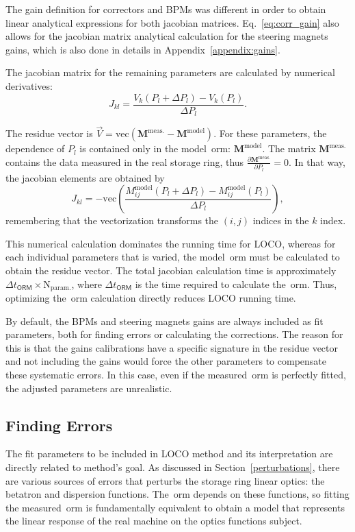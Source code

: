 The gain definition for correctors and BPMs was different in order to obtain linear analytical expressions for both jacobian matrices. Eq.~\eqref{eq:corr_gain} also allows for the jacobian matrix analytical calculation for the steering magnets gains, which is also done in details in Appendix~\ref{appendix:gains}. 

The jacobian matrix for the remaining parameters are calculated by numerical derivatives:
\begin{equation}
    J_{kl} = \dfrac{V_{k}\left(P_{l} + \Delta P_{l}\right) - V_{k}\left(P_{l}\right)}{\Delta P_{l}}.
\end{equation}

The residue vector is $\vec{V} = \mathrm{vec}\left(\mathbf{M}^{\mathrm{meas.}} - \mathbf{M}^{\mathrm{model}}\right)$. For these parameters, the dependence of $P_l$ is contained only in the model~\gls{orm}: $\mathbf{M}^{\mathrm{model}}$. The matrix $\mathbf{M}^{\mathrm{meas.}}$ contains the data measured in the real storage ring, thus $\frac{\partial\mathbf{M}^{\mathrm{meas.}}}{\partial P_l} = 0$. In that way, the jacobian elements are obtained by
\begin{equation}
    J_{kl} = -\mathrm{vec}\left(\dfrac{M_{ij}^{\mathrm{model}}\left(P_{l} + \Delta P_{l}\right) - M_{ij}^{\mathrm{model}}\left(P_{l}\right)}{\Delta P_{l}}\right),
\end{equation}
remembering that the vectorization transforms the $(i, j)$ indices in the $k$ index.

This numerical calculation dominates the running time for LOCO, whereas for each individual parameters that is varied, the model~\gls{orm} must be calculated to obtain the residue vector. The total jacobian calculation time is approximately $\Delta t_{\mathsf{ORM}} \times \mathrm{N}_{\mathrm{param.}}$, where $\Delta t_{\mathsf{ORM}}$ is the time required to calculate the~\gls{orm}. Thus, optimizing the~\gls{orm} calculation directly reduces LOCO running time. 

By default, the BPMs and steering magnets gains are always included as fit parameters, both for finding errors or calculating the corrections. The reason for this is that the gains calibrations have a specific signature in the residue vector and not including the gains would force the other parameters to compensate these systematic errors. In this case, even if the measured~\gls{orm} is perfectly fitted, the adjusted parameters are unrealistic. 
\subsection{Finding Errors}
The fit parameters to be included in LOCO method and its interpretation are directly related to method's goal. As discussed in Section~\ref{perturbations}, there are various sources of errors that perturbs the storage ring linear optics: the betatron and dispersion functions. The~\gls{orm} depends on these functions, so fitting the measured~\gls{orm} is fundamentally equivalent to obtain a model that represents the linear response of the real machine on the optics functions subject.

